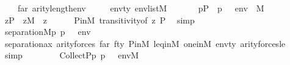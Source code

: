 \begin{isabellebody}
\ \ \ \ far{\isacharcolon}{\kern0pt}\ {\isachardoublequoteopen}arity{\isacharparenleft}{\kern0pt}{\isasymphi}{\isacharparenright}{\kern0pt}{\isasymle}length{\isacharparenleft}{\kern0pt}env{\isacharparenright}{\kern0pt}{\isachardoublequoteclose}\ \isanewline
\ \ \ \ envty{\isacharcolon}{\kern0pt}\ {\isachardoublequoteopen}env{\isasymin}list{\isacharparenleft}{\kern0pt}M{\isacharparenright}{\kern0pt}{\isachardoublequoteclose}\isanewline
\ \ \isanewline
\ \ \ \ {\isachardoublequoteopen}{\isacharbraceleft}{\kern0pt}p{\isasymin}P\ {\isachardot}{\kern0pt}\ p\ {\isasymtturnstile}\ {\isasymphi}\ env{\isacharbraceright}{\kern0pt}\ {\isasymin}\ M{\isachardoublequoteclose}\isanewline
%
\isadelimproof
%
\endisadelimproof
%
\isatagproof
{}\isamarkupfalse%
\ {\isacharminus}{\kern0pt}\isanewline
\ \ \isamarkupfalse%
\ {\isachardoublequoteopen}z{\isasymin}P\ {\isasymLongrightarrow}\ z{\isasymin}M{\isachardoublequoteclose}\ \ z\isanewline
\ \ \ \ \isamarkupfalse%
\ P{\isacharunderscore}{\kern0pt}in{\isacharunderscore}{\kern0pt}M\ transitivity{\isacharbrackleft}{\kern0pt}of\ z\ P{\isacharbrackright}{\kern0pt}\ \isamarkupfalse%
\ simp\isanewline
\ \ \isamarkupfalse%
\isanewline
\ \ \isamarkupfalse%
\ {\isachardoublequoteopen}separation{\isacharparenleft}{\kern0pt}{\isacharhash}{\kern0pt}{\isacharhash}{\kern0pt}M{\isacharcomma}{\kern0pt}{\isasymlambda}p{\isachardot}{\kern0pt}\ {\isacharparenleft}{\kern0pt}p\ {\isasymtturnstile}\ {\isasymphi}\ env{\isacharparenright}{\kern0pt}{\isacharparenright}{\kern0pt}{\isachardoublequoteclose}\isanewline
\ \ \ \ \ \ \ \ \isamarkupfalse%
\ separation{\isacharunderscore}{\kern0pt}ax\ arity{\isacharunderscore}{\kern0pt}forces\ far\ fty\ P{\isacharunderscore}{\kern0pt}in{\isacharunderscore}{\kern0pt}M\ leq{\isacharunderscore}{\kern0pt}in{\isacharunderscore}{\kern0pt}M\ one{\isacharunderscore}{\kern0pt}in{\isacharunderscore}{\kern0pt}M\ envty\ arity{\isacharunderscore}{\kern0pt}forces{\isacharunderscore}{\kern0pt}le\isanewline
\ \ \ \ \isamarkupfalse%
\ simp\isanewline
\ \ \isamarkupfalse%
\ \isanewline
\ \ \isamarkupfalse%
\ {\isachardoublequoteopen}Collect{\isacharparenleft}{\kern0pt}P{\isacharcomma}{\kern0pt}{\isasymlambda}p{\isachardot}{\kern0pt}\ {\isacharparenleft}{\kern0pt}p\ {\isasymtturnstile}\ {\isasymphi}\ env{\isacharparenright}{\kern0pt}{\isacharparenright}{\kern0pt}{\isasymin}M{\isachardoublequoteclose}\isanewline

\end{isabellebody}
